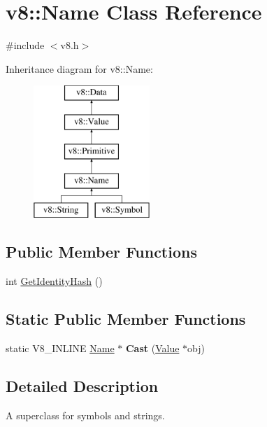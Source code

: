 \hypertarget{classv8_1_1Name}{}\section{v8\+:\+:Name Class Reference}
\label{classv8_1_1Name}


{\ttfamily \#include $<$v8.\+h$>$}

Inheritance diagram for v8\+:\+:Name\+:\begin{figure}[H]
\begin{center}
\leavevmode
\includegraphics[height=5.000000cm]{classv8_1_1Name}
\end{center}
\end{figure}
\subsection*{Public Member Functions}
\begin{DoxyCompactItemize}
\item 
int \mbox{\hyperlink{classv8_1_1Name_aef60fce47685fad12914304f6bc52bf2}{Get\+Identity\+Hash}} ()
\end{DoxyCompactItemize}
\subsection*{Static Public Member Functions}
\begin{DoxyCompactItemize}
\item 
\mbox{\label{classv8_1_1Name_a38bb2124c25f5089afd5fc1f9e87066f}} 
static V8\+\_\+\+I\+N\+L\+I\+NE \mbox{\hyperlink{classv8_1_1Name}{Name}} $\ast$ {\bfseries Cast} (\mbox{\hyperlink{classv8_1_1Value}{Value}} $\ast$obj)
\end{DoxyCompactItemize}


\subsection{Detailed Description}
A superclass for symbols and strings. 

